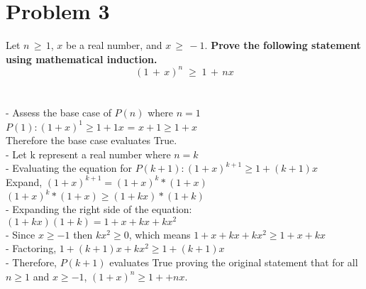 \documentclass{amsart}
\theoremstyle{definition}
\theoremstyle{Exercise}
\theoremstyle{remark}
\theoremstyle{rule}
\numberwithin{equation}{section}
\begin{document}
  \section*{}
  \section*{}
  \section*{Problem 3}
  Let $n\, \geq \, 1$, $x$ be a real number, and $x\, \geq\,-1$. {\bf Prove the following statement using mathematical induction.}
  \[(1\,+\,x)^n\;\geq\;1\,+\,nx\]
\\\\
  - Assess the base case of $P(n)$ where $n = 1$\\
  \indent $P(1): (1+x)^1 \geq 1 + 1x$\; =\; $x+1 \geq 1 + x$\\
  \indent Therefore the base case evaluates True.\\
  - Let k represent a real number where $n=k$\\
  - Evaluating the equation for $P(k+1): (1+x)^{k+1} \geq 1 +(k+1)x$\\
  \indent Expand, $(1+x)^{k+1} = (1+x)^k * (1+x)$\\
  \indent $(1+x)^k * (1+x) \geq (1+kx)*(1+k)$\\
  - Expanding the right side of the equation:\\
  \indent $(1+kx)(1+k) = 1 + x + kx + kx^2$\\
  - Since $x \geq -1$ then $kx^2 \geq 0$, which means $1 + x + kx + kx^2 \geq 1 + x + kx$\\
  - Factoring, $1 + (k+1)x + kx^2 \geq 1 + (k+1)x$\\
  - Therefore, $P(k+1)$ evaluates True proving the original statement that for all $n \geq 1$ and $x \geq -1$, $(1+x)^n \geq 1 ++ nx$.\\
\\\\
\newpage
  \section*{}
  \section*{}
\end{document}
